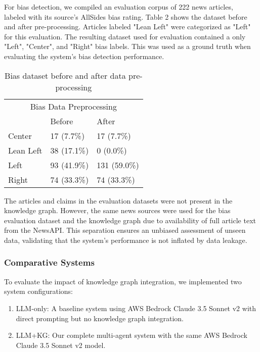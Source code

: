 \documentclass{scrartcl}
\begin{document}
For bias detection, we compiled an evaluation corpus of 222 news articles,  labeled with its source's AllSides bias rating. Table 2 shows the dataset before and after pre-processing. Articles labeled "Lean Left" were categorized as "Left" for this evaluation. The resulting dataset used for evaluation contained a only "Left", "Center", and "Right" bias labels. This was used as a ground truth when evaluating the system's bias detection performance. 
\begin{table}[H]
\begin{center}
\begin{tabular}{lll}
\hline
\multicolumn{3}{c}{Bias Data Preprocessing} \\
            & Before        & After         \\ \hline
Center      & 17 (7.7\%)    & 17 (7.7\%)    \\
Lean Left   & 38 (17.1\%)   & 0 (0.0\%)     \\
Left        & 93 (41.9\%)   & 131 (59.0\%)  \\
Right       & 74 (33.3\%)   & 74 (33.3\%)   \\ \hline
\end{tabular}
\caption{Bias dataset before and after data pre-processing}
\label{tab:my_table}
\end{center}
\end{table}

The articles and claims in the evaluation datasets were not present in the knowledge graph. However, the same news sources were used for the bias evaluation dataset and the knowledge graph due to availability of full article text from the NewsAPI. This separation ensures an unbiased assessment of unseen data, validating that the system’s performance is not inflated by data leakage.

\subsubsection{Comparative Systems}

To evaluate the impact of knowledge graph integration, we implemented two system configurations:
\begin{enumerate}
    \item LLM-only: A baseline system using AWS Bedrock Claude 3.5 Sonnet v2 with direct prompting but no knowledge graph integration. 
    \item LLM+KG: Our complete multi-agent system with the same AWS Bedrock Claude 3.5 Sonnet v2 model.
\end{enumerate}
\end{document}
